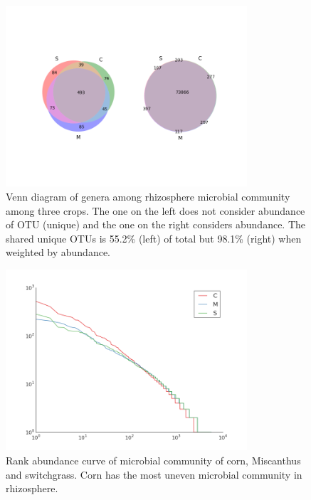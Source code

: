 \documentclass[12pt]{article}
\begin{document}
    \begin{figure}[tbph!]
    \centering
    \includegraphics[width=0.8\textwidth]{figures/genus-venn}
    \caption[Venn diagram of genera]{Venn diagram of genera among rhizosphere microbial community among three crops. The one on the left does not consider abundance of OTU (unique) and the one on the right considers abundance. The shared unique OTUs is 55.2\% (left) of total but 98.1\% (right) when weighted by abundance.}
    \label{fig:genus-venn}
    \end{figure}


    \begin{figure}[tbph!]
    \centering
    \includegraphics[width=0.8\textwidth]{figures/otu-rankabuncurve}
    \caption[Rank abundance curve]{Rank abundance curve of microbial community of corn, Miscanthus and switchgrass. Corn has the most uneven microbial community in rhizosphere.}
    \label{fig:otu-rankabuncurve}
    \end{figure}
\end{document}
